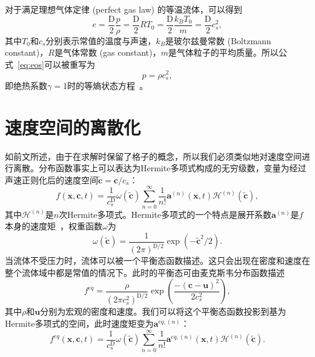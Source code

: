 对于满足理想气体定律 (perfect gas law) 的等温流体，可以得到
\begin{equation}
    e=\frac{\mathrm{D}}{2} \frac{p}{\rho}=\frac{\mathrm{D}}{2} R T_0=\frac{\mathrm{D}}{2} \frac{k_B T_0}{m}=\frac{\mathrm{D}}{2} c_s^2,
\end{equation}
其中$T_0$和$c_s$分别表示常值的温度与声速，$k_B$是玻尔兹曼常数 (Boltzmann constant)，$R$是气体常数 (gas constant)，$m$是气体粒子的平均质量。所以公式~\ref{eq:eos}可以被重写为
\begin{equation}
    p=\rho c_s^2,
\end{equation}
即绝热系数$\gamma=1$时的等熵状态方程~\citep{kundu2015fluid}。


\section{速度空间的离散化}
如前文所述，由于在求解时保留了格子的概念，所以我们必须类似地对速度空间进行离散。分布函数事实上可以表达为Hermite多项式构成的无穷级数，变量为经过声速正则化后的速度空间$\tilde{\mathbf{c}}=\mathbf{c}/c_s$：
\begin{equation}
    f(\boldsymbol{x}, \mathbf{c}, t)=\frac{1}{c_s^{\mathrm{D}}} \omega(\tilde{\mathbf{c}}) \sum_{n=0}^{\infty} \frac{1}{n !} \boldsymbol{a}^{(n)}(\boldsymbol{x}, t) \mathscr{H}^{(n)}(\tilde{\mathbf{c}}),
    \label{eq:hermite_f}
\end{equation}
其中$\mathscr{H}^{(n)}$是$n$次Hermite多项式。Hermite多项式的一个特点是展开系数$\boldsymbol{a}^{(n)}$是$f$本身的速度矩~\citep{shan2006kinetic}，权重函数$\omega$为
\begin{equation}
    \omega(\tilde{\mathbf{c}})=\frac{1}{(2 \pi)^{\mathrm{D} / 2}} \exp \left(-\tilde{\mathbf{c}}^2 / 2\right).
\end{equation}
当流体不受压力时，流体可以被一个平衡态函数描述。这只会出现在密度和速度在整个流体域中都是常值的情况下。此时的平衡态可由麦克斯韦分布函数描述
\begin{equation}
    f^{eq}=\frac{\rho}{\left(2 \pi c_s^2\right)^{\mathrm{D} / 2}} \exp \left(\frac{-(\mathbf{c}-\boldsymbol{u})^2}{2 c_s^2}\right),
    \label{eq:maxwell_eq}
\end{equation}
其中$\rho$和$\boldsymbol{u}$分别为宏观的密度和速度。我们可以将这个平衡态函数投影到基为Hermite多项式的空间，此时速度矩变为$\boldsymbol{a}^{eq,(n)}$：
\begin{equation}
    f^{eq}(\boldsymbol{x}, \mathbf{c}, t)=\frac{1}{c_s^{\mathrm{D}}} \omega(\tilde{\mathbf{c}}) \sum_{n=0}^{\infty} \frac{1}{n !} \boldsymbol{a}^{eq,(n)}(\boldsymbol{x}, t) \mathscr{H}^{(n)}(\tilde{\mathbf{c}}).
    \label{eq:maxwell_eq_hermite}
\end{equation}
